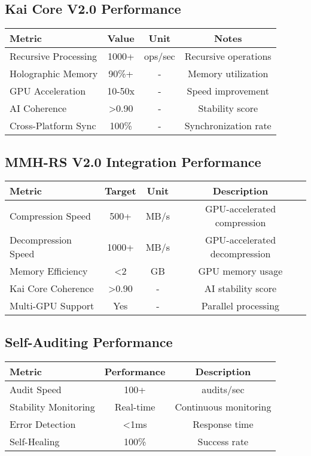 \documentclass[12pt,a4paper]{article}
\begin{document}
\subsection{Kai Core V2.0 Performance}
\begin{center}
\begin{tabular}{|l|c|c|c|}
\hline
\textbf{Metric} & \textbf{Value} & \textbf{Unit} & \textbf{Notes} \\
\hline
Recursive Processing & 1000+ & ops/sec & Recursive operations \\
Holographic Memory & 90\%+ & - & Memory utilization \\
GPU Acceleration & 10-50x & - & Speed improvement \\
AI Coherence & >0.90 & - & Stability score \\
Cross-Platform Sync & 100\% & - & Synchronization rate \\
\hline
\end{tabular}
\end{center}

\subsection{MMH-RS V2.0 Integration Performance}
\begin{center}
\begin{tabular}{|l|c|c|c|}
\hline
\textbf{Metric} & \textbf{Target} & \textbf{Unit} & \textbf{Description} \\
\hline
Compression Speed & 500+ & MB/s & GPU-accelerated compression \\
Decompression Speed & 1000+ & MB/s & GPU-accelerated decompression \\
Memory Efficiency & <2 & GB & GPU memory usage \\
Kai Core Coherence & >0.90 & - & AI stability score \\
Multi-GPU Support & Yes & - & Parallel processing \\
\hline
\end{tabular}
\end{center}

\subsection{Self-Auditing Performance}
\begin{center}
\begin{tabular}{|l|c|c|}
\hline
\textbf{Metric} & \textbf{Performance} & \textbf{Description} \\
\hline
Audit Speed & 100+ & audits/sec \\
Stability Monitoring & Real-time & Continuous monitoring \\
Error Detection & <1ms & Response time \\
Self-Healing & 100\% & Success rate \\
\hline
\end{tabular}
\end{center}
\end{document}
